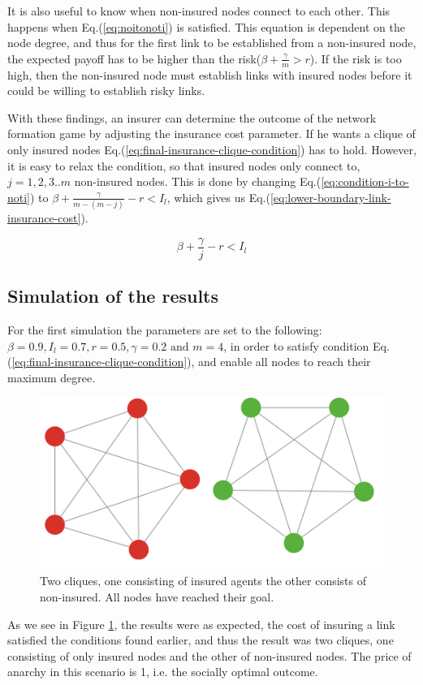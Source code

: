 It is also useful to know when non-insured nodes connect to each other. This happens when Eq.(\ref{eq:noitonoti}) is satisfied. This equation is dependent on the node degree, and thus for the first link to be established from a non-insured node, the expected payoff has to be higher than the risk($\beta+\frac{\gamma}{m}>r$). If the risk is too high, then the non-insured node must establish links with insured nodes before it could be willing to establish risky links.

With these findings, an insurer can determine the outcome of the network formation game by adjusting the insurance cost parameter.
If he wants a clique of only insured nodes Eq.(\ref{eq:final-insurance-clique-condition}) has to
hold. However, it is easy to relax the condition, so that insured nodes only connect to, $j=1,2,3..m$ non-insured nodes.
   This is done by changing Eq.(\ref{eq:condition-i-to-noti}) to $\beta+\frac{\gamma}{m-(m-j)}-r<I_{l}$, which
    gives us Eq.(\ref{eq:lower-boundary-link-insurance-cost}).

\begin{equation} 
\beta+\frac{\gamma}{j}-r<I_{l}
\label{eq:lower-boundary-link-insurance-cost}
\end{equation} 

\subsection{Simulation of the results}
For the first simulation the parameters are set to the following: $\beta=0.9, I_{l}=0.7, r=0.5, \gamma=0.2 \text{ and }m=4$, in order to satisfy condition Eq.(\ref{eq:final-insurance-clique-condition}), and enable all nodes to reach their maximum degree.  

\begin{figure}[h]
\centering
  \includegraphics[width=0.7\linewidth]{../Figures/BonusGameInsuredClique.png}
  \caption{\label{fig:bonusoptimal} Two cliques, one consisting of insured agents the other consists of non-insured. All nodes have reached their goal. }
\end{figure}
As we see in Figure \ref{fig:bonusoptimal}, the results were as expected, the cost of insuring a link satisfied the conditions found earlier, and thus the result was two cliques, one consisting of only insured nodes and the other of non-insured nodes.
The price of anarchy in this scenario is 1, i.e. the socially optimal outcome. 

